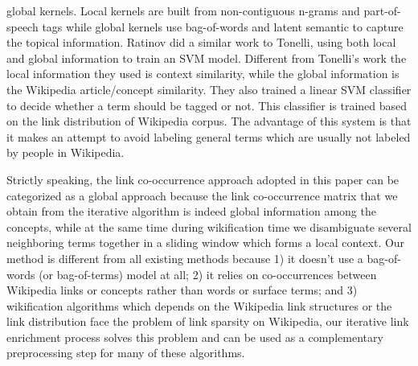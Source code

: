 global kernels. Local kernels are built from non-contiguous n-grams and
part-of-speech tags while global kernels use bag-of-words and latent
semantic to capture the topical information.
Ratinov \cite{RatinovRDA11} did a similar work to Tonelli, using both local
and global information to train an SVM model. Different from Tonelli's work
the local information they used is context similarity, while the
global information is the Wikipedia article/concept similarity.
They also trained a linear SVM classifier to decide
whether a term should be tagged or not.
This classifier is trained based on the link distribution of Wikipedia corpus.
The advantage of this system is that it makes an attempt to avoid labeling
general terms which are usually not labeled by people in Wikipedia.

Strictly speaking, the link co-occurrence approach adopted in this paper
can be categorized as a global approach because the link co-occurrence
matrix that we obtain from the iterative algorithm is indeed global
information among the concepts, while at the same time during wikification
time we disambiguate several neighboring terms together in a sliding
window which forms a local context. Our method is different from all
existing methods because 1) it doesn't use a bag-of-words
(or bag-of-terms) model at all; 2) it relies on co-occurrences between
Wikipedia links or concepts rather than words or surface terms; and
3) wikification algorithms which depends on the Wikipedia link structures
or the link distribution face the problem of link sparsity on Wikipedia,
our iterative link enrichment process solves this problem and
can be used as a complementary preprocessing step for many of these algorithms.


